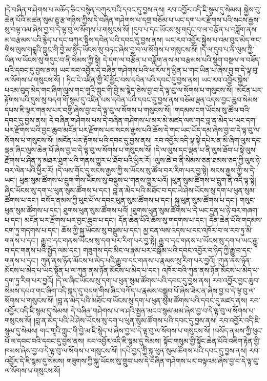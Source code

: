 །དེ་བཞིན་གཤེགས་པ་མཆོད་ཅིང་བསྙེན་བཀུར་བའི་དབང་དུ་བྱས་ནས། རབ་འབྱོར་འདི་ཇི་སྙམ་དུ་སེམས། སྐྱེས་བུ་ཆེན་པོའི་མཚན་སུམ་ཅུ་རྩ་གཉིས་ཀྱིས་དེ་བཞིན་གཤེགས་པ་དགྲ་བཅོམ་པ་ཡང་དག་པར་རྫོགས་པའི་སངས་རྒྱས་སུ་བལྟ་འམ་ཞེས་བྱ་བ་དེ་ལྟ་བུ་ལ་སོགས་པ་གསུངས་སོ། །དུབ་པ་དང་ཡོངས་སུ་གདུང་བ་ལ་བརྩོན་པ་བཟློག་ནས་མ་བརྩམས་པའི་རྙེད་པ་དང་བཀུར་སྟིས་དབེན་པའི་དབང་དུ་བྱས་ནས། ཡང་རབ་འབྱོར་སྐྱེས་པ་འམ་བུད་མེད་གང་གིས་ལུས་གངྒཱའི་ཀླུང་གི་བྱེ་མ་སྙེད་ཡོངས་སུ་བཏང་ཞེས་བྱ་བ་ལ་སོགས་པ་གསུངས་སོ། །དེ་ལ་དུབ་པ་ནི་ལུས་ཀྱི་ཡིན་ལ་ཡོངས་སུ་གདུང་བ་ནི་སེམས་ཀྱི་སྟེ། དེ་དག་ལ་བརྩོན་པ་བཟློག་ནས་མ་བརྩམས་པའི་སྡུག་བསྔལ་ལ་བཟོད་པའི་དབང་དུ་བྱས་ནས། ཡང་རབ་འབྱོར་དེ་བཞིན་གཤེགས་པའི་ཕ་རོལ་ཏུ་ཕྱིན་པ་གང་ཡིན་པ་ཞེས་བྱ་བ་དེ་ལྟ་བུ་ལ་སོགས་པ་གསུངས་སོ། །
ཏིང་ངེ་འཛིན་གྱི་རོ་མྱོང་བས་དབེན་པའི་དབང་དུ་བྱས་ནས། ཡང་རབ་འབྱོར་སྐྱེས་པའམ་བུད་མེད་གང་ཞིག་ལུས་གང་གཱའི་ཀླུང་གི་བྱེ་མ་སྙེད་ཅེས་བྱ་བ་དེ་ལྟ་བུ་ལ་སོགས་པ་གསུངས་སོ། །མངོན་པར་རྟོགས་པའི་དུས་སུ་བདག་གོ་སྙམ་དུ་འཛིན་པས་དབེན་པའི་དབང་དུ་བྱས་ནས་བཅོམ་ལྡན་འདས་བྱང་ཆུབ་སེམས་དཔས་ཇི་ལྟར་གནས་པར་བགྱི་ཞེས་བྱ་བ་དེ་ལྟ་བུ་ལ་སོགས་པ་གསུངས་སོ། །གདམས་ངག་ཡོངས་སུ་ཚོལ་བའི་དབང་དུ་བྱས་ནས། དེ་བཞིན་གཤེགས་པས་དེ་བཞིན་གཤེགས་པ་མར་མེ་མཛད་ལས་གང་བླ་ན་མེད་པ་ཡང་དག་པར་རྫོགས་པའི་བྱང་ཆུབ་མངོན་པར་རྫོགས་པར་སངས་རྒྱས་པའི་ཆོས་དེ་གང་ཡང་ཡོད་དམ་ཞེས་བྱ་བ་དེ་ལྟ་བུ་ལ་སོགས་པ་གསུངས་སོ། །མངོན་པར་རྟོགས་པའི་དབང་དུ་བྱས་ནས། རབ་འབྱོར་འདི་ལྟ་སྟེ་དཔེར་ན་མི་ཞིག་ལུས་དང་ལྡན་ཞིང་ལུས་ཆེན་པོ་ཞེས་བྱ་བ་དེ་ལྟ་བུ་ལ་སོགས་པ་གསུངས་སོ། །དེ་ལ་ལུས་དང་ལྡན་པ་ནི་ལུས་ཐོབ་པ་སྟེ་ལུས་རྫོགས་པ་ཤིན་ཏུ་མཐར་ཐུག་པའི་གནས་གྱུར་པ་ཐོབ་པའི་ཕྱིར་རོ། །ལུས་ཆེ་བ་ནི་སེམས་ཅན་ཐམས་ཅད་ཀྱི་ལུས་ཉེ་བར་ལེན་པའི་ཕྱིར་རོ། །དེ་ལས་གོང་དུ་སངས་རྒྱས་ཀྱི་ས་ཡོངས་སུ་ཚོལ་བར་རིག་པར་བྱ་སྟེ། སངས་རྒྱས་ཀྱི་ས་དེ་ཡང་། ཕུན་སུམ་ཚོགས་པ་དྲུག་གིས་ཡོངས་སུ་བསྡུས་པ་གནས་གྱུར་པའོ། །ཕུན་སུམ་ཚོགས་པ་དྲུག་ནི་འདི་ལྟ་སྟེ། ཞིང་ཡོངས་སུ་དག་པ་ཕུན་སུམ་ཚོགས་པ་དང་། བླ་ན་མེད་པའི་མཐོང་བ་དང་ཡེ་ཤེས་ཡོངས་སུ་དག་པ་ཕུན་སུམ་ཚོགས་པ་དང་། བསོད་ནམས་ཀྱི་ཕུང་པོ་ལ་དབང་ཕུན་སུམ་ཚོགས་པ་དང་། སྐུ་ཕུན་སུམ་ཚོགས་པ་དང་། གསུང་ཕུན་སུམ་ཚོགས་པ་དང་། ཐུགས་ཕུན་སུམ་ཚོགས་པའོ། །ཐུགས་ཕུན་སུམ་ཚོགས་པ་དེ་ཡང་དྲན་པ་ཉེ་བར་གཞག་པ་དང་། མངོན་པར་རྫོགས་པར་བྱང་ཆུབ་པ་དང་། དོན་ཆེན་པོའི་ཆོས་སུ་གདགས་པ་དང་། དོན་ཆེན་པོའི་གདམས་ངག་ཏུ་གདགས་པ་དང་། ཆོས་ཀྱི་སྐུ་ཡོངས་སུ་བསྡུས་པ་དང་། མྱ་ངན་ལས་འདས་པ་དང་འཁོར་བ་ལ་རབ་ཏུ་མི་གནས་པ་དང་། རྒྱུ་བ་དང་གནས་ཡོངས་སུ་དག་པར་རིག་པར་བྱ་སྟེ། རྒྱུ་བ་དང་གནས་པ་ཡོངས་སུ་དག་པ་ཡང་རྒྱུ་བ་དང་གནས་པའི་སྤྱོད་ལམ་དང་། གཟུགས་དང་མིང་ལ་རྣམ་པར་བསྒོམ་པའི་དབང་འབྱོར་བ་ཉིད་ཀྱི་རྒྱུ་བ་དང་གནས་པ་དང་། ཀུན་ནས་ཉོན་མོངས་པ་མེད་པའི་རྒྱུ་བ་དང་གནས་པ་རྣམས་སུ་རིག་པར་བྱའོ། །ཀུན་ནས་ཉོན་མོངས་པ་མེད་པ་ཡང་སྟོན་པ་ལ་ཀུན་ནས་ཉོན་མོངས་པ་མེད་པ་དང་། འཁོར་བའི་ཀུན་ནས་ཉོན་མོངས་པ་མེད་པ་དག་ཏུ་རིག་པར་བྱའོ། །དེ་ལ་ཞིང་ཡོངས་སུ་དག་པ་ཕུན་སུམ་ཚོགས་པའི་དབང་དུ་བྱས་ནས། རབ་འབྱོར་བྱང་ཆུབ་སེམས་དཔའ་གང་ཞིག་འདི་སྐད་དུ་བདག་གིས་ཞིང་བཀོད་པ་རྣམས་བསྒྲུབ་པོ་ཞེས་ཟེར་ན་ཞེས་བྱ་བ་དེ་ལྟ་བུ་ལ་སོགས་པ་གསུངས་སོ། །བླ་ན་མེད་པའི་མཐོང་བ་ཡོངས་སུ་དག་པ་ཕུན་སུམ་ཚོགས་པའི་དབང་དུ་མཛད་ནས། རབ་འབྱོར་འདི་ཇི་སྙམ་དུ་སེམས། དེ་བཞིན་གཤེགས་པ་ལ་ཤའི་སྤྱན་མངའ་སྙམ་མམ་ཞེས་བྱ་བ་དེ་ལྟ་བུ་ལ་སོགས་པ་གསུངས་སོ། །བླ་ན་མེད་པའི་ཡེ་ཤེས་ཡོངས་སུ་དག་པ་ཕུན་སུམ་ཚོགས་པའི་དབང་དུ་བྱས་ནས། རབ་འབྱོར་འདི་ཇི་སྙམ་དུ་སེམས། གང་གཱའི་ཀླུང་གི་བྱེ་མ་ཇི་སྙེད་པ་ཞེས་བྱ་བ་དེ་ལྟ་བུ་ལ་སོགས་པ་གསུངས་སོ། །བསོད་ནམས་ཀྱི་ཕུང་པོ་ལ་དབང་བའི་དབང་དུ་བྱས་ནས། རབ་འབྱོར་འདི་ཇི་སྙམ་དུ་སེམས། སྟོང་གསུམ་གྱི་སྟོང་ཆེན་པོའི་འཇིག་རྟེན་གྱི་ཁམས་ཞེས་བྱ་བ་དེ་ལྟ་བུ་ལ་སོགས་པ་གསུངས་སོ། །དཔེ་བྱད་ཀྱི་སྐུ་ཕུན་སུམ་ཚོགས་པའི་དབང་དུ་བྱས་ནས། རབ་འབྱོར་དེ་ཇི་སྙམ་དུ་སེམས། གཟུགས་ཀྱི་སྐུ་ཡོངས་སུ་གྲུབ་པས་དེ་བཞིན་གཤེགས་པར་བལྟའམ་ཞེས་བྱ་བ་དེ་ལྟ་བུ་ལ་སོགས་པ་གསུངས་སོ། 